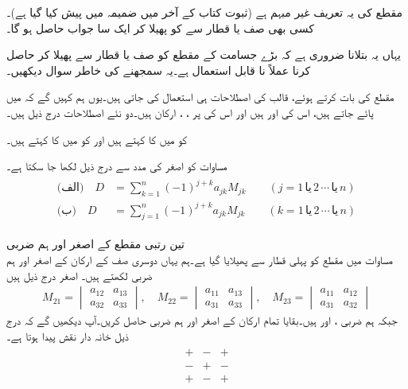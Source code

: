 مقطع کی یہ تعریف غیر مبہم ہے (ثبوت کتاب کے آخر میں ضمیمہ  میں پیش کیا گیا ہے)۔ کسی بھی صف یا قطار سے  کو پھیلا کر ایک سا جواب حاصل ہو گا۔

یہاں یہ بتلانا ضروری ہے کہ بڑے جسامت کے مقطع کو صف یا قطار سے پھیلا کر حاصل کرنا  عملاً نا قابل استعمال ہے۔یہ سمجھنے کی خاطر سوال  دیکھیں۔

مقطع کی بات کرتے ہوئے، قالب کی اصطلاحات ہی استعمال کی جاتی ہیں۔یوں ہم کہیں گے کہ  میں    پائے جاتے ہیں، اس کی   اور   ہیں اور اس کی  پر ، ،  ارکان ہیں۔دو نئے اصطلاحات درج ذیل ہیں۔

 کو  میں  کا  کہتے ہیں اور  کو  میں  کا  کہتے ہیں۔

مساوات  کو اصغر کی مدد سے درج ذیل لکھا جا سکتا ہے۔
\begin{gather}
\begin{aligned}\label{مساوات_الجبرا_مقطع_مجموعہ}
\text{(الف)}\quad D&=\sum_{k=1}^{n} (-1)^{j+k}a_{jk}M_{jk}\quad \quad (j=1\,\text{یا}\, 2\,\cdots \,\text{یا}\, n)\\
\text{(ب)}\quad D&=\sum_{j=1}^{n} (-1)^{j+k}a_{jk}M_{jk}\quad \quad (k=1\,\text{یا}\, 2\,\cdots \,\text{یا}\, n)
\end{aligned}
\end{gather}

\quad تین رتبی مقطع کے اصغر اور ہم ضربی\\
مساوات  میں مقطع کو پہلی قطار سے پھیلایا گیا ہے۔ہم یہاں دوسری صف کے ارکان کے اصغر اور ہم ضربی لکھتے ہیں۔ اصغر درج ذیل ہیں
\begin{align*}
M_{21}=
\begin{vmatrix}
a_{12}&a_{13}\\a_{32}&a_{33}
\end{vmatrix},\quad
M_{22}=
\begin{vmatrix}
a_{11}&a_{13}\\a_{31}&a_{33}
\end{vmatrix},\quad
M_{23}=
\begin{vmatrix}
a_{11}&a_{12}\\a_{31}&a_{32}
\end{vmatrix}
\end{align*}  
جبکہ ہم ضربی ،  اور  ہیں۔بقایا تمام ارکان کے اصغر اور ہم ضربی حاصل کریں۔آپ دیکھیں گے کہ  درج ذیل خانہ دار نقش پیدا ہوتا ہے۔
\begin{align*}
\begin{matrix}
+&-&+\\
-&+&-\\
+&-&+
\end{matrix}
\end{align*}


